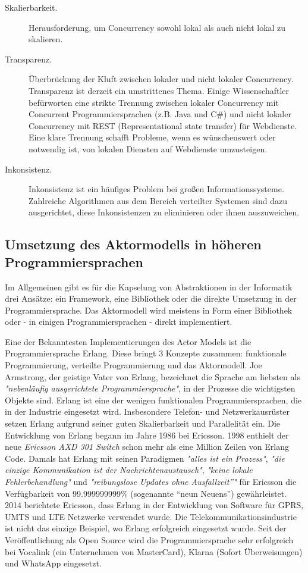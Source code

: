 \begin{description} 
	\item[Skalierbarkeit.] Herausforderung, um Concurrency sowohl lokal als auch nicht lokal zu skalieren.
	
	\item[Transparenz.] Überbrückung der Kluft zwischen lokaler und nicht lokaler Concurrency. Transparenz ist derzeit ein umstrittenes Thema. Einige Wissenschaftler befürworten eine strikte Trennung zwischen lokaler Concurrency mit Concurrent Programmiersprachen (z.B. Java und C\#) und nicht lokaler Concurrency mit REST (Representational state transfer) für Webdienste. Eine klare Trennung schafft Probleme, wenn es wünschenswert oder notwendig ist, von lokalen Diensten auf Webdienste umzusteigen.
	
	\item[Inkonsistenz.] Inkonsistenz ist ein häufiges Problem bei großen Informationssysteme. Zahlreiche Algorithmen aus dem Bereich verteilter Systemen sind dazu ausgerichtet, diese Inkonsistenzen zu eliminieren oder ihnen auszuweichen.
\end{description}

\subsection{Umsetzung des Aktormodells in höheren Programmiersprachen}

Im Allgemeinen gibt es für die Kapselung von Abstraktionen in der Informatik drei Ansätze: ein Framework, eine Bibliothek oder die direkte Umsetzung in der Programmiersprache. Das Aktormodell wird meistens in Form einer Bibliothek oder - in einigen Programmiersprachen - direkt implementiert.

Eine der Bekanntesten Implementierungen des Actor Models ist die Programmiersprache Erlang. Diese bringt 3 Konzepte zusammen: funktionale Programmierung, verteilte Programmierung und das Aktormodell. Joe Armstrong, der geistige Vater von Erlang, bezeichnet die Sprache am liebsten als \textit{"nebenläufig ausgerichtete Programmiersprache"}, in der Prozesse die wichtigsten Objekte sind. Erlang ist eine der wenigen funktionalen Programmiersprachen, die in der Industrie eingesetzt wird. Insbesondere Telefon- und Netzwerkausrüster setzen Erlang aufgrund seiner guten Skalierbarkeit und Parallelität ein. Die Entwicklung von Erlang begann im Jahre 1986 bei Ericsson. 1998 enthielt der neue \textit{Ericsson AXD 301 Switch} schon mehr als eine Million Zeilen von Erlang Code. Damals hat Erlang mit seinen Paradigmen \textit{"alles ist ein Prozess"}, \textit{"die einzige Kommunikation ist der Nachrichtenaustausch"}, \textit{"keine lokale Fehlerbehandlung"} und \textit{"reibungslose Updates ohne Ausfallzeit”"} für Ericsson die Verfügbarkeit von 99.999999999\% (sogenannte “neun Neuens”) gewährleistet. 2014 berichtete Ericsson, dass Erlang in der Entwicklung von Software für GPRS, UMTS und LTE Netzwerke verwendet wurde. Die Telekommunikationsindustrie ist nicht das einzige Beispiel, wo Erlang erfolgreich eingesetzt wurde. Seit der Veröffentlichung als Open Source wird die Programmiersprache sehr erfolgreich bei Vocalink (ein Unternehmen von MasterCard), Klarna (Sofort Überweisungen) und WhatsApp eingesetzt.

